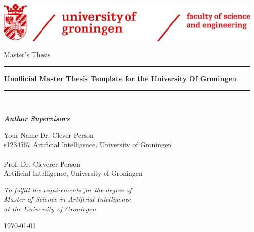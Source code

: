 \documentclass{book}
\begin{document}
\begin{titlepage}
    \begin{center}
        \includegraphics[width=\textwidth]{assets/banner.png}

        \vspace{2cm}

        \Large
        Master's Thesis

        \rule{\linewidth}{0.5pt}
        \Huge
        \textbf{Unofficial Master Thesis Template for the University Of Groningen}\\[-1.1ex]
        \rule{\linewidth}{0.5pt}\\[0.4cm]

        \vspace{1cm}

        \Large

        \textit{\textbf{Author}}
        \hfill
        \textit{\textbf{Supervisors}}

        \large
        \vspace{0.1cm}
        Your Name
        \hfill
        Dr. Clever Person \\
        \small {\color{darkgray} s1234567}
        \hfill
        \small {\color{darkgray} Artificial Intelligence, University of Groningen} \\

        \hfill ~ \\
        \hfill \large Prof. Dr. Cleverer Person \\
        \hfill \small {\color{darkgray} Artificial Intelligence, University of Groningen} \\


        \vfill


        \normalsize
        \textit{To fulfill the requirements for the degree of \\ Master of Science in Artificial Intelligence \\ at the University of Groningen}

        \vspace{1cm}

        \today
    \end{center}
\end{titlepage}

\newpage
\end{document}
